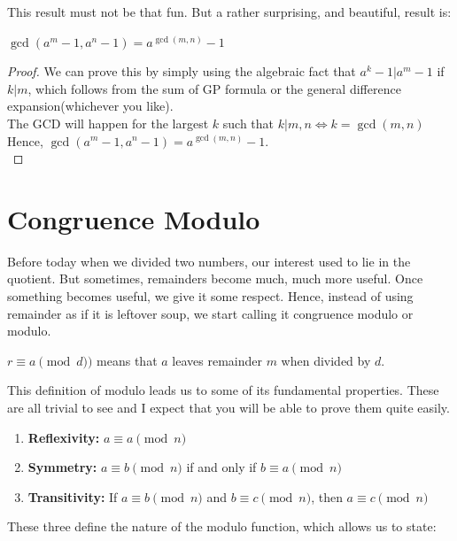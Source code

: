 This result must not be that fun. But a rather surprising, and beautiful, result is:\\
\begin{theorem}
    $\gcd(a^m-1, a^n-1)=a^{\gcd(m,n)}-1$
\end{theorem}
\begin{proof}
    We can prove this by simply using the algebraic fact that $a^k-1|a^m-1$ if $k|m$, which follows from the sum of GP formula or the general difference expansion(whichever you like).\\
    The GCD will happen for the largest $k$ such that $k | m,n \iff k=\gcd(m,n)$\\
    Hence, $\gcd(a^m-1, a^n-1)=a^{\gcd(m,n)}-1$.\\
\end{proof}
\section{Congruence Modulo}
Before today when we divided two numbers, our interest used to lie in the quotient. But sometimes, remainders become much, much more useful. Once something becomes useful, we give it some respect. Hence, instead of using remainder as if it is leftover soup, we start calling it congruence modulo or modulo. 
\begin{definition}
    $r \equiv a \pmod d)$ means that $a$ leaves remainder $m$ when divided by $d$.
\end{definition}
This definition of modulo leads us to some of its fundamental properties. These are all trivial to see and I expect that you will be able to prove them quite easily.
\begin{theorem}
\begin{enumerate}
    \item \textbf{Reflexivity:} $a \equiv a \pmod{n}$\\
    \item \textbf{Symmetry:} $a \equiv b \pmod{n}$ if and only if $b \equiv a \pmod{n}$ \\
    \item \textbf{Transitivity:} If $a \equiv b \pmod{n}$ and $b \equiv c \pmod{n}$, then $a \equiv c \pmod{n}$\\
\end{enumerate}    
\end{theorem}
These three define the nature of the modulo function, which allows us to state:
